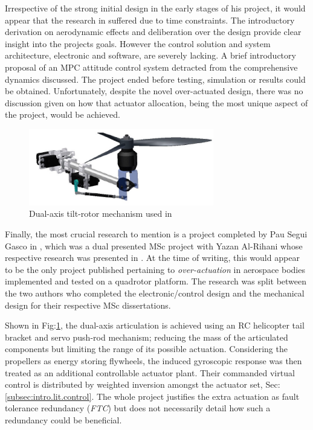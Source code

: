 \par
Irrespective of the strong initial design in the early stages of his project, it would appear that the research in \cite{napsholm} suffered due to time constraints. The introductory derivation on aerodynamic effects and deliberation over the design provide clear insight into the projects goals. However the control solution and system architecture, electronic and software, are severely lacking. A brief introductory proposal of an MPC attitude control system detracted from the comprehensive dynamics discussed. The project ended before testing, simulation or results could be obtained. Unfortunately, despite the novel over-actuated design, there was no discussion given on how that actuator allocation, being the most unique aspect of the project, would be achieved.
\par
\begin{figure}[htbp]
\centering
\includegraphics[width=0.72\textwidth]{figs/gasco-mech}
\caption{Dual-axis tilt-rotor mechanism used in \cite{tiltgasco}}
\label{fig:tiltrotor-gasco}
\vspace{-6pt}
\end{figure}
Finally, the most crucial research to mention is a project completed by Pau Segui Gasco in \cite{tiltgasco}, which was a dual presented MSc project with Yazan Al-Rihani whose respective research was presented in \cite{tiltrihani}. At the time of writing, this would appear to be the only project published pertaining to \emph{over-actuation} in aerospace bodies implemented and tested on a quadrotor platform. The research was split between the two authors who completed the electronic/control design and the mechanical design for their respective MSc dissertations. 
\par
Shown in Fig:\ref{fig:tiltrotor-gasco}, the dual-axis articulation is achieved using an RC helicopter tail bracket and servo push-rod mechanism; reducing the mass of the articulated components but limiting the range of its possible actuation. Considering the propellers as energy storing flywheels, the induced gyroscopic response was then treated as an additional controllable actuator plant. Their commanded virtual control is distributed by weighted inversion amongst the actuator set, Sec:\ref{subsec:intro.lit.control}. The whole project justifies the extra actuation as fault tolerance redundancy (\emph{FTC}) but does not necessarily detail how such a redundancy could be beneficial.
